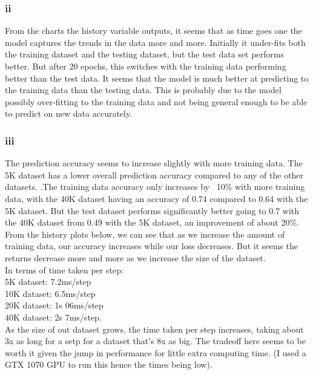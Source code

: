 \documentclass[11pt]{article} %
\begin{document}
\subsubsection{ii}
From the charts the history variable outputs, it seems that as time goes one the model captures the trends in the data more and more.  Initially it under-fits both the training dataset and the testing dataset, but the test data set performs better.  But after 20 epochs, this switches with the training data performing better than the test data. It seems that the model is much better at predicting to the training data than the testing data.  This is probably due to the model possibly over-fitting to the training data and not being general enough to be able to predict on new data accurately.
\subsubsection{iii}
The prediction accuracy seems to increase slightly with more training data.  The 5K dataset has a lower overall prediction accuracy compared to any of the other datasets.  .The training data accuracy only increases by ~10\% with more training data, with the 40K dataset having an accuracy of 0.74 compared to 0.64 with the 5K dataset.  But the test dataset performs significantly better going to 0.7 with the 40K dataset from 0.49 with the 5K dataset,  an improvement of about 20\%.  From the history plots below, we can see that as we increase the amount of training data, our accuracy increases while our loss decreases.  But it seems the returns decrease more and more as we increase the size of the dataset.  \\
In terms of time taken per step: \\ 5K dataset: 7.2ms/step\\10K dataset: 6.5ms/step\\20K dataset: 1s 06ms/step\\40K dataset: 2s 7ms/step. \\
As the size of out dataset grows, the time taken per step increases, taking about 3x as long for a setp for a dataset that's 8x as big.  The tradeoff here seems to be worth it given the jump in performance for little extra computing time. (I used a GTX 1070 GPU to run this hence the times being low).
\end{document}
